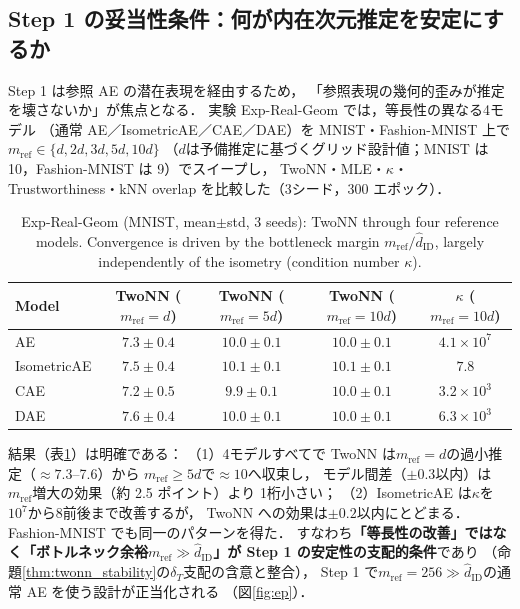 \documentclass[11pt,a4paper]{jsarticle}
\newcommand{\hatdID}{\hat{d}_{\mathrm{ID}}}
\newcommand{\kap}{\kappa}
\begin{document}
\subsection{Step 1 の妥当性条件：何が内在次元推定を安定にするか}\label{sec:exp_real_geom}

Step 1 は参照 AE の潜在表現を経由するため，
「参照表現の幾何的歪みが推定を壊さないか」が焦点となる．
実験 Exp-Real-Geom では，等長性の異なる4モデル
（通常 AE／IsometricAE\cite{kato2020rdae}／CAE\cite{rifai2011cae}／DAE\cite{alain2014dae}）を
MNIST・Fashion-MNIST 上で$m_{\mathrm{ref}} \in \{d, 2d, 3d, 5d, 10d\}$
（$d$は予備推定に基づくグリッド設計値；MNIST は 10，Fashion-MNIST は 9）でスイープし，
TwoNN・MLE・$\kap$・Trustworthiness・kNN overlap を比較した（3シード，300 エポック）．

\begin{table}[H]
\centering
\caption{Exp-Real-Geom (MNIST, mean$\pm$std, 3 seeds): TwoNN through four
reference models. Convergence is driven by the bottleneck margin
$m_{\mathrm{ref}} / \hatdID$, largely independently of the isometry
(condition number $\kap$).}
\label{tab:real_geom}
\small
\begin{tabular}{lcccc}
\toprule
Model & TwoNN ($m_{\mathrm{ref}} = d$) & TwoNN ($m_{\mathrm{ref}} = 5d$) & TwoNN ($m_{\mathrm{ref}} = 10d$) & $\kap$ ($m_{\mathrm{ref}} = 10d$) \\
\midrule
AE          & $7.3 \pm 0.4$ & $10.0 \pm 0.1$ & $10.0 \pm 0.1$ & $4.1 \times 10^{7}$ \\
IsometricAE & $7.5 \pm 0.4$ & $10.1 \pm 0.1$ & $10.1 \pm 0.1$ & $7.8$ \\
CAE         & $7.2 \pm 0.5$ & $9.9 \pm 0.1$  & $10.0 \pm 0.1$ & $3.2 \times 10^{3}$ \\
DAE         & $7.6 \pm 0.4$ & $10.0 \pm 0.1$ & $10.0 \pm 0.1$ & $6.3 \times 10^{3}$ \\
\bottomrule
\end{tabular}
\end{table}

結果（表\ref{tab:real_geom}）は明確である：
（1）4モデルすべてで TwoNN は$m_{\mathrm{ref}} = d$の過小推定（$\approx 7.3$--7.6）から
$m_{\mathrm{ref}} \geq 5d$で$\approx 10$へ収束し，
モデル間差（$\pm 0.3$以内）は$m_{\mathrm{ref}}$増大の効果（約 2.5 ポイント）より
1桁小さい；
（2）IsometricAE は$\kap$を$10^{7}$から$8$前後まで改善するが，
TwoNN への効果は$\pm 0.2$以内にとどまる．
Fashion-MNIST でも同一のパターンを得た．
すなわち\textbf{「等長性の改善」ではなく「ボトルネック余裕$m_{\mathrm{ref}} \gg \hatdID$」が
Step 1 の安定性の支配的条件}であり
（命題\ref{thm:twonn_stability}の$\delta_T$支配の含意と整合），
Step 1 で$m_{\mathrm{ref}} = 256 \gg \hatdID$の通常 AE を使う設計が正当化される
（図\ref{fig:ep}）．
\end{document}
